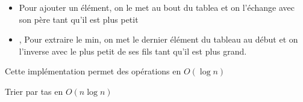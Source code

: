 \begin{principe}
	\enspace
	\begin{itemize}[label=$\star$]
		\item Pour ajouter un élément, on le met au bout du tablea et on l'échange avec son père tant qu'il est plus petit
		\item, Pour extraire le min, on met le dernier élément du tableau au début et on l'inverse avec le plus petit de ses fils tant qu'il est plus grand.
	\end{itemize}
\end{principe}

\begin{proposition}
	Cette implémentation permet des opérations en $O(\log n)$
\end{proposition}

\begin{appl}
	Trier par tas en $O(n \log n)$
\end{appl}